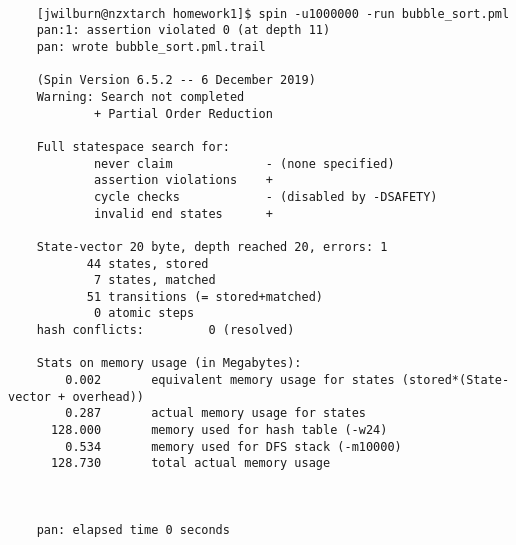 \documentclass[11pt]{article}
\begin{document}
\begin{enumerate}
  
  \begin{scriptsize}
    \begin{verbatim}
    
    [jwilburn@nzxtarch homework1]$ spin -u1000000 -run bubble_sort.pml 
    pan:1: assertion violated 0 (at depth 11)
    pan: wrote bubble_sort.pml.trail
    
    (Spin Version 6.5.2 -- 6 December 2019)
    Warning: Search not completed
            + Partial Order Reduction
    
    Full statespace search for:
            never claim             - (none specified)
            assertion violations    +
            cycle checks            - (disabled by -DSAFETY)
            invalid end states      +
    
    State-vector 20 byte, depth reached 20, errors: 1
           44 states, stored
            7 states, matched
           51 transitions (= stored+matched)
            0 atomic steps
    hash conflicts:         0 (resolved)
    
    Stats on memory usage (in Megabytes):
        0.002       equivalent memory usage for states (stored*(State-vector + overhead))
        0.287       actual memory usage for states
      128.000       memory used for hash table (-w24)
        0.534       memory used for DFS stack (-m10000)
      128.730       total actual memory usage
    
    
    
    pan: elapsed time 0 seconds

    \end{verbatim}
    \end{scriptsize}
    
\end{enumerate}
\end{document}
